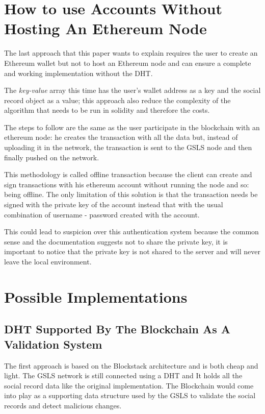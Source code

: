 \section{How to use Accounts Without Hosting An Ethereum Node}

The last approach that this paper wants to explain requires the user to create an Ethereum wallet but not to host an Ethereum node and can ensure a complete and working implementation without the DHT.

The \textit{key-value} array this time has the user's wallet address as a key and the social record object as a value; this approach also reduce the complexity of the algorithm that needs to be run in solidity and therefore the costs.

The steps to follow are the same as the user participate in the blockchain with an ethereum node: he creates the transaction with all the data but, instead of uploading it in the network, the transaction is sent to the GSLS node and then finally pushed on the network.

This methodology is called offline transaction because the client can create and sign transactions with his ethereum account without running the node and so: being offline. The only limitation of this solution is that the transaction needs be signed with the private key of the account instead that with the usual combination of username - password created with the account.

This could lead to suspicion over this authentication system because the common sense and the documentation suggests not to share the private key, it is important to notice that the private key is not shared to the server and will never leave the local environment.


\section{Possible Implementations}

\subsection{DHT Supported By The Blockchain As A Validation System}
The first approach is based on the Blockstack architecture and is both cheap and light. The GSLS network is still connected using a DHT and It holds all the social record data like the original implementation. The Blockchain would come into play as a supporting data structure used by the GSLS to validate the social records and detect malicious changes.

